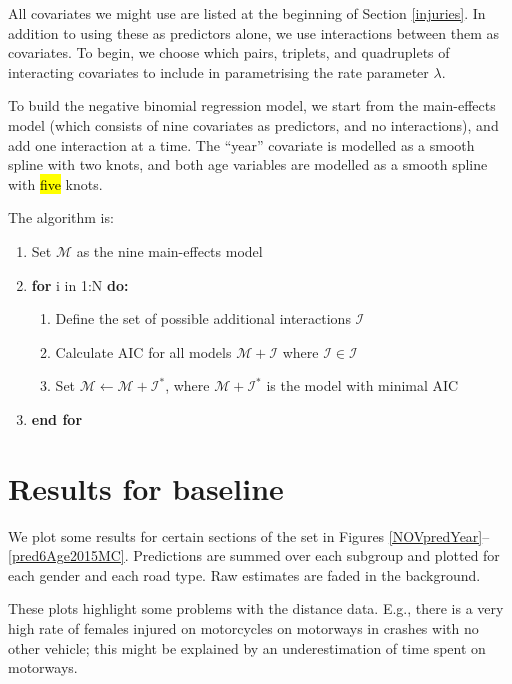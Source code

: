 \documentclass{article}
\begin{document}
All covariates we might use are listed at the beginning of Section \ref{injuries}. In addition to using these as predictors alone, we use interactions between them as covariates. To begin, we choose which pairs, triplets, and quadruplets of interacting covariates to include in parametrising the rate parameter $\lambda$.

To build the negative binomial regression model, we start from the main-effects model (which consists of nine covariates as predictors, and no interactions), and add one interaction at a time. The ``year'' covariate is modelled as a smooth spline with two knots, and both age variables are modelled as a smooth spline with \hl{five} knots. 

The algorithm is:
\begin{enumerate}
\item Set $\mathcal{M}$ as the nine main-effects model
\item \textbf{for} i in 1:N \textbf{do:}
\begin{enumerate}
\item Define the set of possible additional interactions $\mathscr{I}$
\item Calculate AIC for all models $\mathcal{M+I}$ where $\mathcal{I}\in\mathscr{I}$
\item Set $\mathcal{M}\leftarrow\mathcal{M+I^*}$, where $\mathcal{M+I^*}$ is the model with minimal AIC
\end{enumerate}
\item\textbf{end for}
\end{enumerate}

\section{Results for baseline}\label{results}

We plot some results for certain sections of the set in Figures \ref{NOVpredYear}--\ref{pred6Age2015MC}. Predictions are summed over each subgroup and plotted for each gender and each road type. Raw estimates are faded in the background.

These plots highlight some problems with the distance data. E.g., there is a very high rate of females injured on motorcycles on motorways in crashes with no other vehicle; this might be explained by an underestimation of time spent on motorways.
\end{document}
